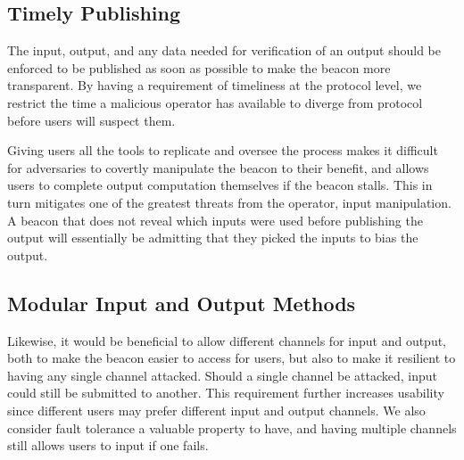 \subsection{Timely Publishing}
The input, output, and any data needed for verification of an output should be enforced to be published as soon as possible to make the beacon more transparent.
By having a requirement of timeliness at the protocol level, we restrict the time a malicious operator has available to diverge from protocol before users will suspect them.

Giving users all the tools to replicate and oversee the process makes it difficult for adversaries to covertly manipulate the beacon to their benefit, and allows users to complete output computation themselves if the beacon stalls.
This in turn mitigates one of the greatest threats from the operator, input manipulation.
A beacon that does not reveal which inputs were used before publishing the output will essentially be admitting that they picked the inputs to bias the output.

\subsection{Modular Input and Output Methods}
Likewise, it would be beneficial to allow different channels for input and output, both to make the beacon easier to access for users, but also to make it resilient to having any single channel attacked.
Should a single channel be attacked, input could still be submitted to another.
This requirement further increases usability since different users may prefer different input and output channels.
We also consider fault tolerance a valuable property to have, and having multiple channels still allows users to input if one fails.

